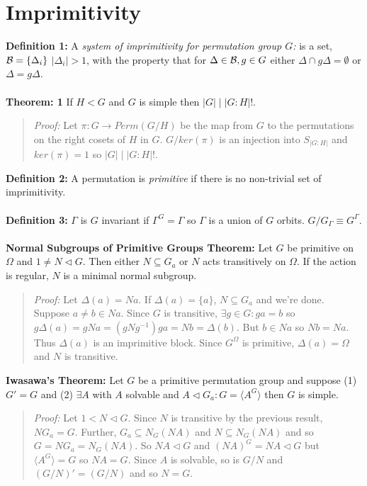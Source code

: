 \section {Imprimitivity}
{\bf Definition 1:}
A \emph{system of imprimitivity for permutation 
group $G$:} is a set, ${\cal B} = \{ \Delta_i\}$ $|\Delta_i| > 1$, with
the property that for $\Delta \in {\cal B}, g \in G$ either 
$\Delta \cap g \Delta = \emptyset$ or
$\Delta = g \Delta$.
\\
\\
{\bf Theorem: 1}
If $H<G$ and $G$ is simple then $|G| \mid |G:H|!$. 
\begin{quote}
\emph{Proof:}  
Let  $\pi: G \rightarrow Perm(G/H)$ be the map from $G$ to the permutations on the right
cosets of $H$ in $G$.  $G/ker(\pi)$ is an injection into $S_{|G:H|}$ and $ker(\pi)=1$ so
$|G| \mid |G:H|!$.
\end{quote}
{\bf Definition 2:}
A permutation is \emph{primitive} if there is no non-trivial set of imprimitivity.
\\
\\
{\bf Definition 3:}
$\Gamma$ is $G$ invariant if $\Gamma^G= \Gamma$ so $\Gamma$ is a union of $G$ orbits.
$G/G_{\Gamma} \equiv G^{\Gamma}$.
\\
\\
{\bf Normal Subgroups of Primitive Groups Theorem:}  
Let $G$ be primitive on $\Omega$ and $1 \ne N \lhd G$.  Then either $N \subseteq G_a$ or
$N$ acts transitively on $\Omega$.  If the action is regular, $N$ is a minimal normal subgroup.
\begin{quote}
\emph{Proof:}  
Let $\Delta(a)= Na$.  If $\Delta(a)= \{ a \}$, $N \subseteq G_a$ and we're done.
Suppose $a \ne b \in Na$.  Since $G$ is transitive, $\exists g \in G: ga=b$ so
$g \Delta(a)= gNa= (gN g^{-1} ) ga= Nb = \Delta(b)$.  But $b \in Na$ so $Nb = Na$.
Thus $\Delta(a)$ is an imprimitive block.  Since $G^{\Omega}$ is primitive, $\Delta(a)= \Omega$
and $N$ is transitive.
\end{quote}
{\bf Iwasawa's Theorem:}  Let $G$ be a primitive permutation group and suppose (1) $G'=G$ and
(2) $\exists A$ with $A$ solvable  and $A \lhd G_a: G=
\langle A^G \rangle $ then $G$ is simple.
\begin{quote}
\emph{Proof:}  
Let $1 < N \lhd G$.  Since $N$ is transitive by the previous result, $NG_a=G$.  Further,
$G_a \subseteq N_G(NA)$ and $N \subseteq N_G(NA)$ and so $G= NG_a= N_G(NA)$. So $NA \lhd G$ and
$(NA)^G =NA \lhd G$ but $ \langle A^G \rangle = G$ so $NA=G$. 
Since $A$ is solvable, so is $G/N$ and
$(G/N)'=(G/N)$ and so $N = G$.
\end{quote}
